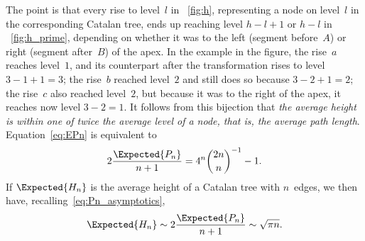 The point is that every rise to level~\(l\) in \fig~\ref{fig:h},
representing a node on level~\(l\) in the corresponding Catalan tree,
ends up reaching level $h-l+1$ or $h-l$ in \fig~\ref{fig:h_prime},
depending on whether it was to the left (segment before~$A$) or right
(segment after~$B$) of the apex.  In the example in the figure, the
rise~$a$ reaches level~$1$, and its counterpart after the
transformation rises to level \(3-1+1=3\); the rise~$b$ reached
level~$2$ and still does so because \(3-2+1=2\); the rise~$c$ also
reached level~$2$, but because it was to the right of the apex, it
reaches now level \(3-2=1\). It follows from this bijection that
\emph{the average height is within one of twice the average level of a
  node, that is, the average path length}. Equation~\eqref{eq:EPn} is
equivalent to
\begin{equation*}
2\frac{\Expected{P_n}}{n+1} = 4^{n}\binom{2n}{n}^{-1} - 1.
\end{equation*}
If \(\Expected{H_n}\) is the average height of a Catalan tree with
\(n\)~edges, we then have, recalling~\eqref{eq:Pn_asymptotics},
\begin{equation*}
\Expected{H_n} \sim 2\frac{\Expected{P_n}}{n+1} \sim \sqrt{\pi n}.
\end{equation*}
